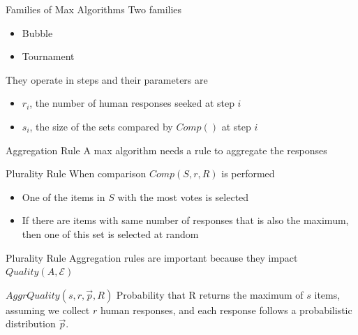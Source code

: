 \documentclass{beamer}
\begin{document}
\begin{frame}{Families of Max Algorithms}
	Two families
	\begin{itemize}
		\item Bubble
		\item Tournament
	\end{itemize}
	\pause
	\vspace{5pt}
	They operate in steps and their parameters are 
	\begin{itemize}
		\item \textbf{\color{beaver_red}$r_i$}, the number of human responses seeked at step $i$
		\item \textbf{\color{beaver_red}$s_i$}, the size of the sets compared by $Comp()$ at step $i$ 
	\end{itemize}
\end{frame}


\begin{frame}{Aggregation Rule}
	A max algorithm %
	needs a rule to aggregate the responses
	\\ %
	\vspace{5pt}
	\begin{block}{Plurality Rule}
		When comparison $Comp(S, r, R)$ is performed
		\begin{itemize}
			\item One of the items in $S$ with the most votes is selected
			\item If there are items with same number of responses that is also the maximum, then one of this set is selected at random 
		\end{itemize}
	\end{block}
\end{frame}

\begin{frame}{Plurality Rule}
	Aggregation rules are important because they impact $Quality(A,\mathcal{E})$
	\\
	\vspace{5pt}
	\begin{block}{$AggrQuality(s, r, \vec{p}, R)$}
		 Probability that R returns the maximum of $s$ items, assuming we collect $r$ human responses, and each response follows a probabilistic distribution $\vec{p}$.
	\end{block}
\end{frame}
\end{document}
